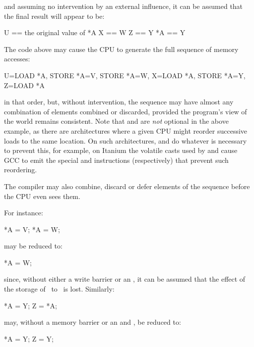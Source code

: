 \noindent%
and assuming no intervention by an external influence, it can be assumed that
the final result will appear to be:

\begin{VerbatimU}
	U == the original value of *A
	X == W
	Z == Y
	*A == Y
\end{VerbatimU}

The code above may cause the CPU to generate the full sequence of memory
accesses:

\begin{VerbatimU}
	U=LOAD *A, STORE *A=V, STORE *A=W, X=LOAD *A, STORE *A=Y, Z=LOAD *A
\end{VerbatimU}

\noindent%
in that order, but, without intervention, the sequence may have almost any
combination of elements combined or discarded, provided the program's view
of the world remains consistent.
Note that  and  are \emph{not} optional
in the above example, as there are architectures where a given CPU might
reorder successive loads to the same location.
On such architectures,  and  do whatever is
necessary to prevent this, for example, on Itanium the volatile casts
used by  and  cause GCC to emit the special
 and  instructions (respectively) that prevent such
reordering.

The compiler may also combine, discard or defer elements of the sequence before
the CPU even sees them.

For instance:

\begin{VerbatimU}
	*A = V;
	*A = W;
\end{VerbatimU}

\noindent%
may be reduced to:

\begin{VerbatimU}
	*A = W;
\end{VerbatimU}

\noindent%
since, without either a write barrier or an , it can be
assumed that the effect of the storage of~ to~ is lost.
Similarly:

\begin{VerbatimU}
	*A = Y;
	Z = *A;
\end{VerbatimU}

\noindent%
may, without a memory barrier or an  and , be
reduced to:

\begin{VerbatimU}
	*A = Y;
	Z = Y;
\end{VerbatimU}

